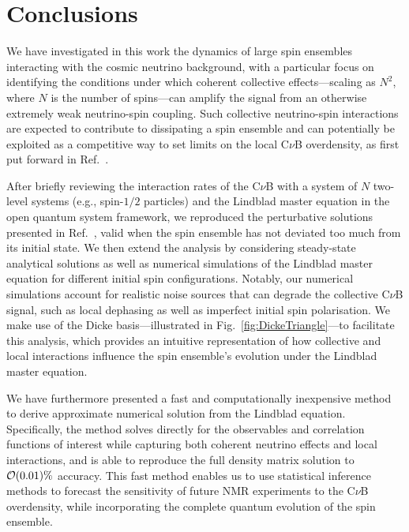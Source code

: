\documentclass[aps,prd,10pt,twocolumn,superscriptaddress,floatfix,nofootinbib,amsmath,amssymb,altaffilletter,preprintnumbers]{revtex4-1}
\begin{document}

\section{Conclusions}
\label{sec:conclusions}

We have investigated in this work the dynamics of large spin ensembles interacting with the cosmic neutrino background, with a particular focus on identifying the conditions under which coherent collective effects---scaling as $N^2$, where $N$ is the number of spins---can amplify the signal from an otherwise extremely weak neutrino-spin coupling. Such collective neutrino-spin interactions are expected to contribute to dissipating  a spin ensemble and can potentially be exploited as a competitive way to set limits on the local C$\nu$B overdensity, as first put forward in Ref.~\cite{Arvanitaki:2024taq}.

After briefly reviewing the interaction rates of the C$\nu$B with a system of $N$ two-level systems (e.g., spin-$1/2$ particles) and the Lindblad master equation in the open quantum system framework, 
we reproduced the perturbative solutions presented in Ref.~\cite{Arvanitaki:2024taq}, valid when the spin ensemble has not deviated too much from its initial state.  We then extend the analysis by considering steady-state analytical solutions as well as numerical simulations of the Lindblad master equation 
for different initial spin configurations.  Notably, our numerical simulations account for realistic noise sources that can degrade the collective C$\nu$B signal, such as local dephasing as well as imperfect initial spin polarisation. We make use of the Dicke basis---illustrated in Fig.~\ref{fig:DickeTriangle}---to facilitate this analysis, which provides an intuitive representation of how collective and local interactions influence the spin ensemble's evolution under the Lindblad master equation.

We have furthermore presented a fast and computationally inexpensive method to derive approximate numerical solution from the Lindblad equation. Specifically, the method solves directly for the observables and correlation functions of interest while capturing both coherent neutrino effects and local interactions, and 
is able to reproduce the full density matrix solution to ${\cal O}(0.01)\%$ accuracy. This fast method enables us to use statistical inference methods to forecast the sensitivity of future NMR experiments to the C$\nu$B overdensity, while incorporating the complete quantum evolution of the spin ensemble.
\end{document}

